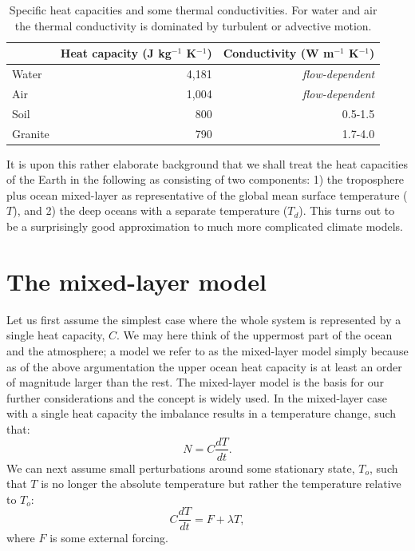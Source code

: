 \documentclass[12pt]{book}
\begin{document}
\begin{table}
  \caption{ Specific heat capacities and some thermal conductivities. For water and air the thermal conductivity is dominated by turbulent or advective motion. }
  \vspace{0.5 cm}
  \centering
  \begin{tabular}{l|rr}
      & Heat capacity (J kg$^{-1}$ K$^{-1}$) &  Conductivity (W m$^{-1}$ K$^{-1}$) \\
    \hline
    Water              & 4,181 &         {\em flow-dependent}   \\
    Air                   & 1,004 &         {\em flow-dependent}    \\
    Soil                 & 800 & 0.5-1.5           \\
    Granite           & 790 & 1.7-4.0             \\
  \end{tabular}
  \label{table:capacity}
\end{table}

It is upon this rather elaborate background that we shall treat the heat capacities of the Earth in the following as consisting of two components: 1) the troposphere plus ocean mixed-layer as representative of the global mean surface temperature ($T$), and 2) the deep oceans with a separate temperature ($T_d$). This turns out to be a surprisingly good approximation to much more complicated climate models.


\section{The mixed-layer model}
Let us first assume the simplest case where the whole system is represented by a single heat capacity, $C$. We may here think of the uppermost part of the ocean and the atmosphere; a model we refer to as the mixed-layer model simply because as of the above argumentation the upper ocean heat capacity is at least an order of magnitude larger than the rest. The mixed-layer model is the basis for our further considerations and the concept is widely used. In the mixed-layer case with a single heat capacity the imbalance results in a temperature change, such that:
\begin{equation}
N = C\frac{dT}{dt}. 
\label{eq:mlo_imbalance}
\end{equation}
We can next assume small perturbations around some stationary state, $T_o$, such that $T$ is no longer the absolute temperature but rather the temperature relative to $T_o$:
\begin{equation}
C\frac{dT}{dt} = F + \lambda T,
\label{eq:mlo}
\end{equation}
where $F$ is some external forcing. 
\end{document}
